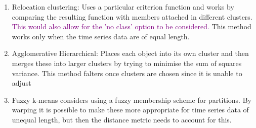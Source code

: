 \documentclass{article}
\newcommand\NOTE[1]{\textcolor{purple}{#1}}
\begin{document}
    \begin{enumerate}
        \item Relocation clustering: Uses a particular criterion function and works by comparing the resulting function with members attached in different clusters. \NOTE{This would also allow for the 'no class' option to be considered.} This method works only when the time series data are of equal length.
        \item Agglomerative Hierarchical: Places each object into its own cluster and then merges these into larger clusters by trying to minimise the sum of squares variance. This method falters once clusters are chosen since it is unable to adjust
        \item Fuzzy k-means considers using a fuzzy membership scheme for partitions. By warping it is possible to make these more appropriate for time series data of unequal length, but then the distance metric needs to account for this.
    \end{enumerate}
\end{document}
